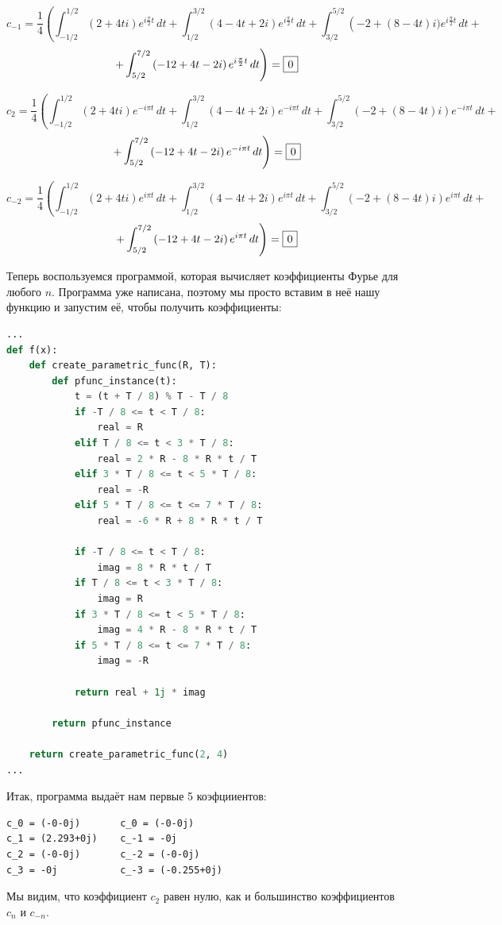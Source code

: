 \documentclass[a4paper]{article}
\newcommand*\msquared[1]{\tikz[baseline=(char.base)]{
            \node[shape=rectangle,draw,inner sep=4pt] (char) {$\displaystyle #1$};}}
\begin{document}
$$c_{-1} = \frac{1}{4}\left( \int_{-1/2}^{1/2} \left( 2 + 4ti \right)e^{i\frac{\pi}{2}t}\,dt + \int_{1/2}^{3/2}\left( 4 - 4t + 2i \right)e^{i\frac{\pi}{2}t}\,dt + \int_{3/2}^{5/2}\left( -2 + (8 - 4t)i)e^{i\frac{\pi}{2}t}\,dt + \right. \right.$$
$$\left.+ \int_{5/2}^{7/2}\left( -12 + 4t -2i \right)e^{i\frac{\pi}{2}t}\,dt \right)=\msquared{0}$$

$$c_2 = \frac{1}{4}\left( \int_{-1/2}^{1/2} \left( 2 + 4ti \right)e^{-i\pi t}\,dt + \int_{1/2}^{3/2}\left( 4 - 4t + 2i \right)e^{-i\pi t}\,dt + \int_{3/2}^{5/2}\left( -2 + (8 - 4t)i \right)e^{-i\pi t}\,dt + \right.$$
$$\left. + \int_{5/2}^{7/2}\left( -12 + 4t -2i \right)e^{-i\pi t}\,dt\right) = \msquared{0}$$

$$c_{-2} = \frac{1}{4}\left( \int_{-1/2}^{1/2} \left( 2 + 4ti \right)e^{i\pi t}\,dt + \int_{1/2}^{3/2}\left( 4 - 4t + 2i \right)e^{i\pi t}\,dt + \int_{3/2}^{5/2}\left( -2 + (8 - 4t)i \right)e^{i\pi t}\,dt + \right.$$
$$\left. + \int_{5/2}^{7/2}\left( -12 + 4t -2i \right)e^{i\pi t}\,dt\right) = \msquared{0}$$

Теперь воспользуемся программой, которая вычисляет коэффициенты Фурье для любого $n$. Программа уже написана, поэтому мы просто вставим в неё нашу функцию и запустим её, чтобы получить коэффициенты:
\begin{lstlisting}[language=Python, caption={Вычисление коэффициентов Фурье для функции $f(t)$}]
...
def f(x):
    def create_parametric_func(R, T):
        def pfunc_instance(t):
            t = (t + T / 8) % T - T / 8
            if -T / 8 <= t < T / 8:
                real = R
            elif T / 8 <= t < 3 * T / 8:
                real = 2 * R - 8 * R * t / T
            elif 3 * T / 8 <= t < 5 * T / 8:
                real = -R
            elif 5 * T / 8 <= t <= 7 * T / 8:
                real = -6 * R + 8 * R * t / T

            if -T / 8 <= t < T / 8:
                imag = 8 * R * t / T
            if T / 8 <= t < 3 * T / 8:
                imag = R
            if 3 * T / 8 <= t < 5 * T / 8:
                imag = 4 * R - 8 * R * t / T
            if 5 * T / 8 <= t <= 7 * T / 8:
                imag = -R

            return real + 1j * imag

        return pfunc_instance

    return create_parametric_func(2, 4)
...   
\end{lstlisting}
Итак, программа выдаёт нам первые 5 коэфцииентов:
\begin{lstlisting}[caption=Вывод программы]
c_0 = (-0-0j)       c_0 = (-0-0j)
c_1 = (2.293+0j)    c_-1 = -0j
c_2 = (-0-0j)       c_-2 = (-0-0j)
c_3 = -0j           c_-3 = (-0.255+0j)
\end{lstlisting}
Мы видим, что коэффициент $c_2$ равен нулю, как и большинство коэффициентов $c_n$ и $c_{-n}$.
\end{document}
